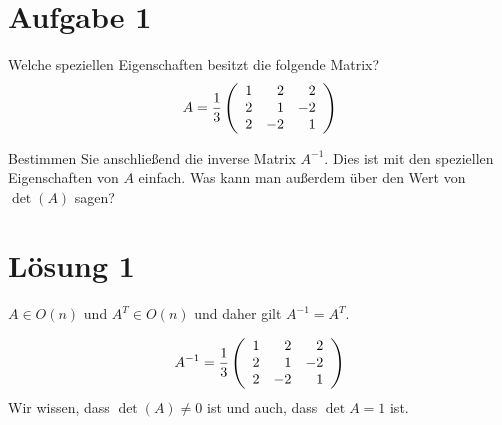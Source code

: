 \documentclass[main.tex]{subfiles}
\begin{document}
\section{Aufgabe 1}
Welche speziellen Eigenschaften besitzt die folgende Matrix?
$$
    A = \frac{1}{3} \eqmatrix{rrr}{
        1 & 2 & 2 \\
        2 & 1 & -2 \\
        2 & -2 & 1
    }
$$

Bestimmen Sie anschließend die inverse Matrix $A^{-1}$. Dies ist mit den speziellen Eigenschaften von $A$ einfach. Was kann man außerdem  über den Wert von $\det(A)$ sagen?

\section{Lösung 1}

$A\in O(n)$ und $A^T \in O(n)$ und daher gilt $A^{-1} = A^T$.

$$
    A^{-1} = \frac{1}{3} \eqmatrix{rrr}{
        1 & 2 & 2 \\
        2 & 1 & -2 \\
        2 & -2 & 1
    }
$$
Wir wissen, dass $\det(A) \neq 0$ ist und auch, dass $\det{A} = 1$ ist. 
\end{document}
